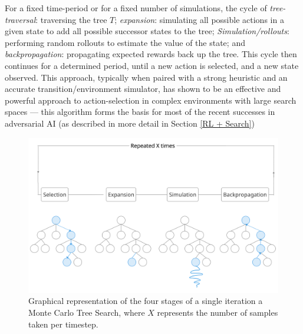 \newline \newline
For a fixed time-period or for a fixed number of simulations, the cycle of \textit{tree-traversal}: traversing the tree $T$; \textit{expansion}: simulating all possible actions in a given state to add all possible successor states to the tree; \textit{Simulation/rollouts}: performing random rollouts to estimate the value of the state; and \textit{backpropagation}: propagating expected rewards back up the tree. This cycle then continues for a determined period, until a new action is selected, and a new state observed. 
\newline \newline
This approach, typically when paired with a strong heuristic and an accurate transition/environment simulator, has shown to be an effective and powerful approach to action-selection in complex environments with large search spaces --- this algorithm forms the basis for most of the recent successes in adversarial AI (as described in more detail in Section \ref{RL + Search}) 

\begin{figure}
    \caption{Graphical representation of the four stages of a single iteration a Monte Carlo Tree Search, where $X$ represents the number of samples taken per timestep.}
    \includegraphics[width = \textwidth]{Figures/MonteCarlo.png}
    \centering
\end{figure}

